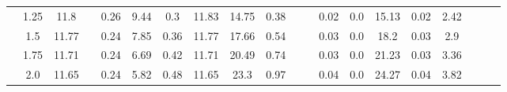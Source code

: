 \documentclass[a4paper,12pt]{article}
\begin{document}
\begin{table}[htbp]
\begin{tabular}{|c|c|c|c|c|c|c|c|c|c|c|c|c|c|c|c|c|c|c|c|}
			& 1.25       & 11.8       &                       & 0.26          & 9.44          & 0.3           & 11.83         & 14.75         & 0.38          &                        &                         & 0.02               & 0.0                & 15.13      & 0.02            & 2.42                &                       &                       &                       \\ \cline{2-3} \cline{5-10} \cline{13-17}
			& 1.5        & 11.77      &                       & 0.24          & 7.85          & 0.36          & 11.77         & 17.66         & 0.54          &                        &                         & 0.03               & 0.0                & 18.2       & 0.03            & 2.9                 &                       &                       &                       \\ \cline{2-3} \cline{5-10} \cline{13-17}
			& 1.75       & 11.71      &                       & 0.24          & 6.69          & 0.42          & 11.71         & 20.49         & 0.74          &                        &                         & 0.03               & 0.0                & 21.23      & 0.03            & 3.36                &                       &                       &                       \\ \cline{2-3} \cline{5-10} \cline{13-17}
			& 2.0        & 11.65      &                       & 0.24          & 5.82          & 0.48          & 11.65         & 23.3          & 0.97          &                        &                         & 0.04               & 0.0                & 24.27      & 0.04            & 3.82                &                       &                       &                       \\ \hline
		\end{tabular}%
	\end{table}
\end{document}
